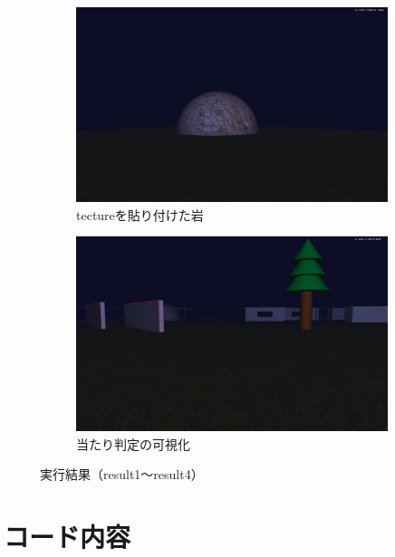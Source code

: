 \documentclass[upIatex,dvipdfmx,a4paper]{jsarticle}
\begin{document}
\begin{figure}[H]
    \begin{subfigure}[b]{0.48\linewidth}
        \includegraphics[width=\linewidth]{result3.png}
        \caption{tectureを貼り付けた岩}
        \label{fig:result3}
    \end{subfigure}
    \hfill
    \begin{subfigure}[b]{0.48\linewidth}
        \includegraphics[width=\linewidth]{result4.png}
        \caption{当たり判定の可視化}
        \label{fig:result4}
    \end{subfigure}

    \caption{実行結果（result1〜result4）}
    \label{fig:results}
\end{figure}

\section{コード内容}
\end{document}
